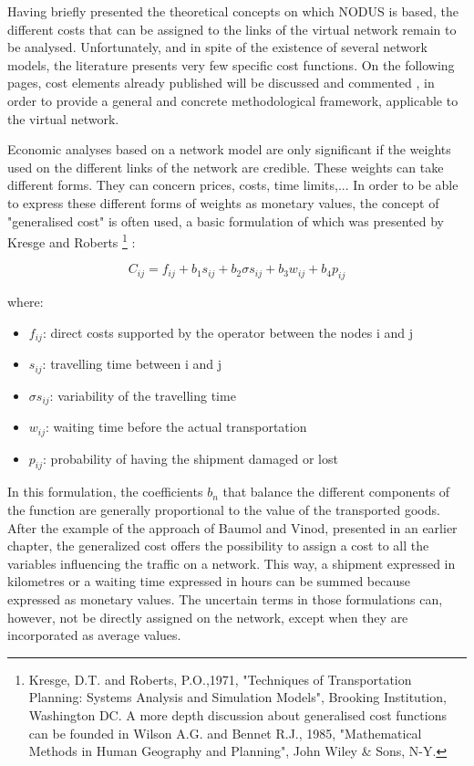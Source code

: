 
Having briefly presented the theoretical concepts on which NODUS is based, the
different costs that can be assigned to the links of the virtual network remain to be analysed.
Unfortunately, and in spite of the existence of several network models,
the literature presents very few specific cost functions.  On the
following pages, cost elements already published will be discussed and commented
, in order to provide a general and concrete methodological framework,
applicable to the virtual network.

Economic analyses based on a network model are only significant if the
weights used on the different links of the network are credible.  These
weights can take different forms.  They can concern prices, costs, time
limits,... In order to be able to express these different forms of weights as
monetary values, the concept of "generalised cost" is often used, a basic
formulation of which was presented by Kresge and Roberts \footnote{Kresge, D.T.
and Roberts, P.O.,1971, "Techniques of Transportation Planning: Systems Analysis
and Simulation Models", Brooking Institution, Washington DC. A more depth discussion about generalised cost functions can be founded in Wilson A.G. and Bennet R.J., 1985, "Mathematical Methods in
Human Geography and Planning", John Wiley \& Sons, N-Y.} :

$$C_{ij}=f_{ij}+b_1s_{ij}+b_2\sigma s_{ij}+b_3w_{ij}+b_4p_{ij}$$

where:
\begin{itemize}
\item $f_{ij}$: direct costs supported by the operator between the nodes i and j
\item $s_{ij}$: travelling time between i and j
\item $\sigma s_{ij}$: variability of the travelling time
\item $w_{ij}$: waiting time before the actual transportation
\item $p_{ij}$: probability of having the shipment damaged or lost
\end{itemize}


In this formulation, the coefficients $b_n$ that balance the different
components of the function are generally proportional to the value of the
transported goods. After the example of the approach of Baumol and Vinod,
presented in an earlier chapter, the generalized cost offers the possibility to
assign a cost to all the variables influencing the traffic on a network.  This
way, a shipment expressed in kilometres or a waiting time expressed in hours can
be summed because expressed as monetary values.  The uncertain terms in those
formulations can, however, not be directly assigned on the network, except when
they are incorporated as average values.

